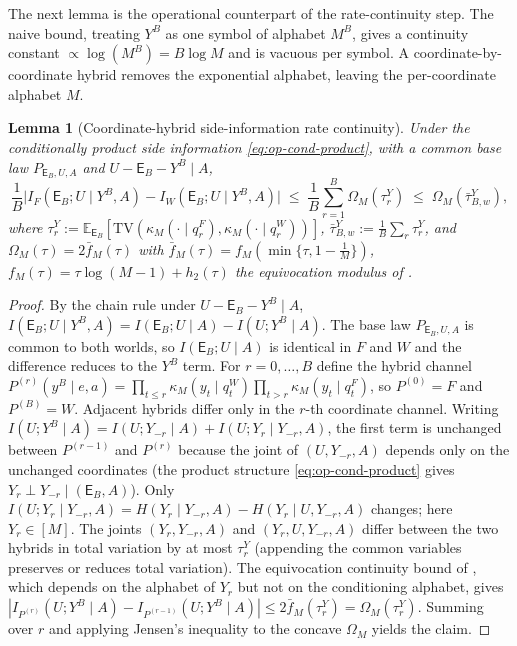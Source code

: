 \documentclass[11pt]{article}
\newcommand{\E}{\mathbb{E}}
\newcommand{\TV}{\mathrm{TV}}
\theoremstyle{plain}
\newtheorem{lemma}[theorem]{Lemma}
\theoremstyle{definition}
\theoremstyle{remark}
\begin{document}
The next lemma is the operational counterpart of the rate-continuity
step. The naive bound, treating $Y^B$ as one symbol of alphabet
$M^B$, gives a continuity constant $\propto\log(M^B)=B\log M$ and is
vacuous per symbol. A coordinate-by-coordinate hybrid removes the
exponential alphabet, leaving the per-coordinate alphabet $M$.

\begin{lemma}[Coordinate-hybrid side-information rate continuity]
\label{lem:op-hybrid}
Under the conditionally product side information
\eqref{eq:op-cond-product}, with a common base law
$P_{\mathsf E_B,U,A}$ and $U-\mathsf E_B-Y^B\mid A$,
\[
\frac1B\bigl|I_F(\mathsf E_B;U\mid Y^B,A)-I_W(\mathsf E_B;U\mid Y^B,A)\bigr|
\;\le\;\frac1B\sum_{r=1}^B\Omega_M(\tau_r^Y)\;\le\;\Omega_M(\bar\tau^Y_{B,w}),
\]
where $\tau_r^Y:=\E_{\mathsf E_B}[\TV(\kappa_M(\cdot\mid q_r^F),\kappa_M(\cdot\mid q_r^W))]$,
$\bar\tau^Y_{B,w}:=\tfrac1B\sum_r\tau_r^Y$, and
$\Omega_M(\tau)=2\bar f_M(\tau)$ with
$\bar f_M(\tau)=f_M(\min\{\tau,1-\tfrac1M\})$,
$f_M(\tau)=\tau\log(M-1)+h_2(\tau)$ the
equivocation modulus of \citet{alhejjismith2020equivocation}.
\end{lemma}
\begin{proof}
By the chain rule under $U-\mathsf E_B-Y^B\mid A$,
$I(\mathsf E_B;U\mid Y^B,A)=I(\mathsf E_B;U\mid A)-I(U;Y^B\mid A)$.
The base law $P_{\mathsf E_B,U,A}$ is common to both worlds, so
$I(\mathsf E_B;U\mid A)$ is identical in $F$ and $W$ and the
difference reduces to the $Y^B$ term. For $r=0,\dots,B$ define the
hybrid channel $P^{(r)}(y^B\mid e,a)=\prod_{t\le r}\kappa_M(y_t\mid q_t^W)\prod_{t>r}\kappa_M(y_t\mid q_t^F)$,
so $P^{(0)}=F$ and $P^{(B)}=W$. Adjacent hybrids differ only in the
$r$-th coordinate channel. Writing
$I(U;Y^B\mid A)=I(U;Y_{-r}\mid A)+I(U;Y_r\mid Y_{-r},A)$, the first
term is unchanged between $P^{(r-1)}$ and $P^{(r)}$ because the joint
of $(U,Y_{-r},A)$ depends only on the unchanged coordinates (the
product structure \eqref{eq:op-cond-product} gives $Y_r\perp Y_{-r}\mid(\mathsf E_B,A)$).
Only $I(U;Y_r\mid Y_{-r},A)=H(Y_r\mid Y_{-r},A)-H(Y_r\mid U,Y_{-r},A)$
changes; here $Y_r\in[M]$. The joints
$(Y_r,Y_{-r},A)$ and $(Y_r,U,Y_{-r},A)$ differ between the two hybrids
in total variation by at most $\tau_r^Y$ (appending the common
variables preserves or reduces total variation). The equivocation
continuity bound of \citet{alhejjismith2020equivocation}, which
depends on the alphabet of $Y_r$ but not on the conditioning
alphabet, gives
$|I_{P^{(r)}}(U;Y^B\mid A)-I_{P^{(r-1)}}(U;Y^B\mid A)|\le2\bar f_M(\tau_r^Y)=\Omega_M(\tau_r^Y)$.
Summing over $r$ and applying Jensen's inequality to the concave
$\Omega_M$ yields the claim.
\end{proof}
\end{document}
